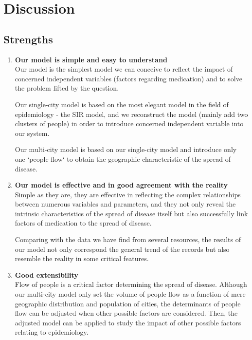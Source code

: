 \section{Discussion}
\subsection{Strengths}
\begin{enumerate}
\item \textbf{Our model is simple and easy to understand} \\
Our model is the simplest model we can conceive to reflect the impact of concerned independent variables (factors regarding medication) and to solve the problem lifted by the question. 

Our single-city model is based on the most elegant model in the field of epidemiology - the SIR model, and we reconstruct the model (mainly add two clusters of people) in order to introduce concerned independent variable into our system. 

Our multi-city model is based on our single-city model and introduce only one `people flow` to obtain the geographic characteristic of the spread of disease.

\item \textbf{Our model is effective and in good agreement with the reality} \\
Simple as they are, they are effective in reflecting the complex relationships between numerous variables and parameters, and they not only reveal the intrinsic characteristics of the spread of disease itself but also successfully link factors of medication to the spread of disease.

Comparing with the data we have find from several resources, the results of our model not only correspond the general trend of the records but also resemble the reality in some critical features.

\item \textbf{Good extensibility} \\
Flow of people is a critical factor determining the spread of disease. Although our multi-city model only set the volume of people flow as a function of mere geographic distribution and population of cities, the determinants of people flow can be adjusted when other possible factors are considered. Then, the adjusted model can be applied to study the impact of other possible factors relating to epidemiology.

\end{enumerate}



